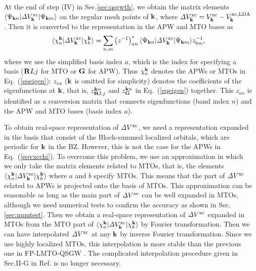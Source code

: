 \documentclass[a4paper,10pt,fleqn]{article}
\def\Psikn{\Psi_{{\bf k}n}}
\def\vxc{V^{\rm xc}}
\def\Dvxc{{\it \Delta} V^{\rm xc}}
\def\Psikn{{\Psi_{{\bf k}n}}}
\def\Psikm{{\Psi_{{\bf k}m}}}
\def\brl{{\bf R}L}
\newcommand{\bfk}{{\bf k}}
\newcommand{\bfG}{{\bf G}}
\newcommand{\req}[1]{\mbox{Eq.~(\ref{#1})}}
\begin{document}
At the end of step (IV) in Sec.\ref{sec:qsgwth}, we obtain the matrix elements
$\langle \Psikn | \Dvxc_\bfk | \Psikm \rangle$ on the regular mesh
points of $\bfk$, where
$\Dvxc_\bfk=\vxc_\bfk-V^{\rm xc,LDA}_\bfk$.
Then it is converted to the representation in the APW and MTO bases as
\begin{eqnarray}
\langle \chi^{\bfk}_a| \Dvxc_\bfk | \chi^{\bfk}_b \rangle
= \sum_{n,m} \left(z^{-1}\right)^*_{an}\langle \Psikn |\Dvxc_\bfk |
\Psikm \rangle z_{bm}^{-1}, \nonumber \\
\label{eqvxcchi}
\end{eqnarray}
where we use the simplified basis index $a$, which is the index for specifying a basis 
($\brl{j}$ for MTO or ${\bfG}$ for APW).
Thus $\chi^{\bfk}_a$ denotes the APWs or MTOs in \req{eqeigen};
$z_{na}$ ($\bfk$ is omitted for simplicity)
denotes the coefficients of the eigenfunctions at $\bfk$, that is,
$z^{{\bfk}n}_{\brl{j}}$ and $z^{\bfk n}_{\bfG}$ in \req{eqeigen} together.
This $z_{an}$ is identified as a conversion matrix that connects
eigenfunctions (band index $n$) and the APW and MTO bases (basis index $a$).

To obtain real-space representation of $\Dvxc$, we need a representation
expanded in the basis that consist of the Bloch-summed localized orbitals, 
which are periodic for $\bfk$ in the BZ. However, this is not the case for the APWs in
\req{eqvxcchi}. To overcome this problem, we use an approximation 
in which we only take the matrix elements 
related to MTOs, that is, the elements 
$\langle \chi^{\bfk}_a| \Dvxc_\bfk | \chi^{\bfk}_b \rangle$
where $a$ and $b$ specify MTOs.
This means that the part of $\Dvxc$ related to APWs is projected onto the basis of MTOs.
This approximation can be reasonable as long as the main part of $\Dvxc$ can be
well expanded in MTOs,
although we need numerical tests to confirm the accuracy as shown in Sec.\ref{sec:numtest}.
Then we obtain a real-space representation of 
$\Dvxc$ expanded in MTOs from the MTO part of 
$\langle \chi^{\bfk}_a| \Dvxc_\bfk | \chi^{\bfk}_b \rangle$ by Fourier transformation.
Then we can have interpolated $\Dvxc$ at any $\bfk$ by inverse Fourier transformation.
Since we use highly localized MTOs, 
this interpolation is more stable 
than the previous one in FP-LMTO-QSGW \cite{kotani_quasiparticle_2007}.
The complicated interpolation procedure 
given in Sec.II-G in Ref.\cite{kotani_quasiparticle_2007} is no
longer necessary.
\end{document}
